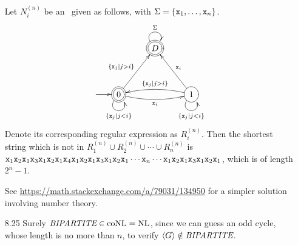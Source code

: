 \begin{itemize}
	\item[\Star 8.24]
		Let $N_i^{(n)}$ be an \NFA\ given as follows, with $\Sigma = \{\texttt{x}_1, \dots, \texttt{x}_n\}$.
		$$
			\xymatrix@R=3pc@C=2pc{
				& *+<1pc>[o][F=]{D} \ar@(lu,ru)[]^{\Sigma} & \\
				*+<1pc>[o][F=]{0} \ar@(l,l)[]^{} \ar@(ld,rd)[]_{\{ \TT{x}_j | j < i \}} \ar@/_/[rr]_{\TT{x}_i} \ar[ru]^{\{ \TT{x}_j | j > i \}} && 
				*+<1pc>[o][F-]{1} \ar@(ld,rd)[]_{\{ \TT{x}_j | j < i \}} \ar[lu]_{\TT{x}_i} \ar@/_/[ll]_{\{ \TT{x}_j | j > i \}}			
			}
		$$
		Denote its corresponding regular expression as $R_i^{(n)}$. Then the shortest string which is not in $R_1^{(n)} \cup R_2^{(n)} \cup \cdots \cup R_n^{(n)}$ is $\texttt{x}_1 \texttt{x}_2 \texttt{x}_1 \texttt{x}_3 \texttt{x}_1 \texttt{x}_2 \texttt{x}_1 \texttt{x}_4 \texttt{x}_1 \texttt{x}_2 \texttt{x}_1 \texttt{x}_3 \texttt{x}_1 \texttt{x}_2 \texttt{x}_1 \cdots \texttt{x}_n \cdots \texttt{x}_1 \texttt{x}_2 \texttt{x}_1 \texttt{x}_3 \texttt{x}_1 \texttt{x}_2 \texttt{x}_1$, which is of length $2^{n}-1$.
		
		See \url{https://math.stackexchange.com/a/79031/134950} for a simpler solution involving number theory.
	
	\item[8.25]
	Surely $\textit{BIPARTITE} \in \textrm{coNL} = \textrm{NL}$, since we can guess an odd cycle, whose length is no more than $n$, to verify $\langle {G} \rangle \notin \textit{BIPARTITE}$.
	

\end{itemize}
